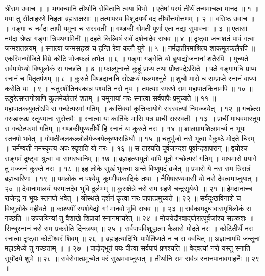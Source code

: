 श्रीराम उवाच ॥ ॥
भगवन्यानि तीर्थानि सेवितानि त्वया विभो ॥
एतेषां परमं तीर्थं तन्ममाचक्ष्व मानद ॥ १ ॥
मया तु सीताहरणे निहता ब्रह्मराक्षसाः ॥
तत्पापस्य विशुदयर्थं वद तीर्थोत्तमोत्तमम् ॥ २ ॥
वसिष्ठ उवाच ॥ ॥
गङ्गा च नर्मदा तापी यमुना च सरस्वती ॥
गण्डकी गोमती पूर्णा एता नद्यः सुपावनाः ॥ ३ ॥
एतासां नर्मदा श्रेष्ठा गङ्गा त्रिपथगामिनी ॥
दहते किल्बिषं सर्वं दर्शनादेव राघव ॥ ४ ॥
दृष्ट्वा जन्मशतं पापं गत्वा जन्मशतत्रयम् ॥
स्नात्वा जन्मसहस्रं च हन्ति रेवा कलौ युगे ॥ ५ ॥
नर्मदातीरमाश्रित्य शाकमूलफलैरपि ॥
एकस्मिन्भोजिते विप्रे कोटि भोजफलं लभेत ॥ ६ ॥
गङ्गा गङ्गेति यो ब्रूयाद्योजनानां शतैरपि ॥
मुच्यते सर्वपापेभ्यो विष्णुलोकं स गच्छति ॥ ७ ॥
फाल्गुनान्ते कुहूं प्राप्य तथा प्रौष्ठपदेऽसिते ॥
पक्षे गङ्गामधि प्राप्य स्नानं च पितृतर्पणम् ॥ ८ ॥
कुरुते पिण्डदानानि सोऽक्षयं फलमश्नुते ॥
शुचौ मासे च सम्प्राप्ते स्नानं वाप्यां करोति यः ॥ ९ ॥
चतुरशीतिनरकान्न पश्यति नरो नृप ॥
तपत्याः स्मरणे राम महापातकिनामपि ॥ १० ॥
उद्धरेत्सप्तगोत्राणि कुलमेकोत्तरं शतम् ॥
यमुनायां नरः स्नात्वा सर्वपापैः प्रमुच्यते ॥ ११ ॥
महापातकयुक्तोऽपि स गच्छेत्परमां गतिम् ॥
कार्त्तिक्यां कृत्तिकायोगे सरस्वत्यां निमज्जयेत् ॥ १२ ॥
गच्छेत्स गरुडारूढः स्तूयमानः सुरोत्तमैः ॥
स्नात्वा यः कार्तिके मासि यत्र प्राची सरस्वती ॥ १३ ॥
प्राचीं माधवमास्तूय स गच्छेत्परमां गतिम् ॥
गण्डकीपुण्यतीर्थे हि स्नानं यः कुरुते नरः ॥ १४ ॥
शालग्रामशिलामर्च्य न भूयः स्तनपो भवेत् ॥
गोमतीजलकल्लोलैर्मज्जयेत्कृष्णसन्निधौ ॥ १५ ॥
चतुर्भुजो नरो भूत्वा वैकुण्ठे मोदते चिरम् ॥
चर्मण्वतीं नमस्कृत्य अपः स्पृशति यो नरः ॥ १६ ॥
स तारयति पूर्वजान्दश पूर्वान्दशापरान् ॥
द्वयोश्च सङ्गमं दृष्ट्वा श्रुत्वा वा सागरध्वनिम् ॥ १७ ॥
ब्रह्महत्यायुतो वापि पूतो गच्छेत्परां गतिम् ॥
माघमासे प्रयागे तु मज्जनं कुरुते नरः ॥ १८ ॥
इह लोके सुखं भुक्त्वा अन्ते विष्णुपदं व्रजेत् ॥
प्रभासे ये नरा राम त्रिरात्रं ब्रह्मचारिणः ॥ १९ ॥
यमलोकं न पश्येयुः कुम्भीपाकादिकं तथा ॥
नैमिषारण्यवासी यो नरो देवत्वमाप्नुयात् ॥ २० ॥
देवानामालयं यस्मात्तदेव भुवि दुर्लभम् ॥
कुरुक्षेत्रे नरो राम ग्रहणे चन्द्रसूर्ययोः ॥ २१ ॥
हेमदानाच्च राजेन्द्र न भूयः स्तनपो भवेत् ॥
श्रीस्थले दर्शनं कृत्वा नरः पापात्प्रमुच्यते ॥ २२ ॥
सर्वदुःखविनाशे च विष्णुलोके महीयते ॥
काश्यपीं स्पर्शयेद्यो गां मानवो भुवि राघव ॥ ॥ २३ ॥
सर्वकामदुघावासमृषिलोकं स गच्छति ॥
उज्जयिन्यां तु वैशाखे शिप्रायां स्नानमाचरेत् ॥ २४ ॥
मोचयेद्रौरवाद्घोरात्पूर्वजांश्च सहस्रशः ॥
सिन्धुस्नानं नरो राम प्रकरोति दिनत्रयम् ॥ २५ ॥
सर्वपापविशुद्धात्मा कैलासे मोदते नरः ॥
कोटितीर्थे नरः स्नात्वा दृष्ट्वा कोटीश्वरं शिवम् ॥ २६ ॥
ब्रह्महत्यादिभिः पापैर्लिप्यते न च स क्वचित् ॥
अज्ञानामपि जन्तूनां महाऽमेध्ये तु गच्छताम् ॥ ॥ २७ ॥
पादोद्भूतं पयः पीत्वा सर्वपापं प्रणश्यति ॥
वेदवत्यां नरो यस्तु स्नाति सूर्योदये शुभे ॥ २८ ॥
सर्वरोगात्प्रमुच्येत परं सुखमवाप्नुयात् ॥
तीर्थानि राम सर्वत्र स्नानपानावगाहनैः ॥ २९ ॥
